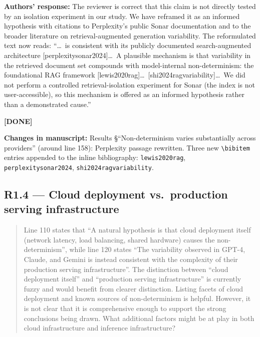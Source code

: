\documentclass[11pt,a4paper]{article}
\newenvironment{revquote}{%
  \begin{quote}\small\itshape\color{revgray}
}{%
  \end{quote}
}
\newcommand{\response}[1]{\par\noindent\textbf{\color{revgreen}Authors' response:} #1\par}
\newcommand{\changes}[1]{\par\noindent\textbf{\color{revblue}Changes in manuscript:} #1\par}
\newcommand{\done}{\color{revgreen}\textbf{[DONE]}}
\begin{document}
\response{The reviewer is correct that this claim is not directly tested by an isolation experiment in our study. We have reframed it as an informed hypothesis with citations to Perplexity's public Sonar documentation and to the broader literature on retrieval-augmented generation variability. The reformulated text now reads: ``\ldots\ is consistent with its publicly documented search-augmented architecture [perplexitysonar2024]\ldots\ A plausible mechanism is that variability in the retrieved document set compounds with model-internal non-determinism: the foundational RAG framework [lewis2020rag]\ldots\ [shi2024ragvariability]\ldots\ We did not perform a controlled retrieval-isolation experiment for Sonar (the index is not user-accessible), so this mechanism is offered as an informed hypothesis rather than a demonstrated cause.''} \done

\changes{Results §``Non-determinism varies substantially across providers'' (around line 158): Perplexity passage rewritten. Three new \texttt{\textbackslash bibitem} entries appended to the inline bibliography: \texttt{lewis2020rag}, \texttt{perplexitysonar2024}, \texttt{shi2024ragvariability}.}

\subsection*{R1.4 --- Cloud deployment vs.\ production serving infrastructure}

\begin{revquote}
Line 110 states that ``A natural hypothesis is that cloud deployment itself (network latency, load balancing, shared hardware) causes the non-determinism'', while line 120 states ``The variability observed in GPT-4, Claude, and Gemini is instead consistent with the complexity of their production serving infrastructure''. The distinction between ``cloud deployment itself'' and ``production serving infrastructure'' is currently fuzzy and would benefit from clearer distinction. Listing facets of cloud deployment and known sources of non-determinism is helpful. However, it is not clear that it is comprehensive enough to support the strong conclusions being drawn. What additional factors might be at play in both cloud infrastructure and inference infrastructure?
\end{revquote}
\end{document}

